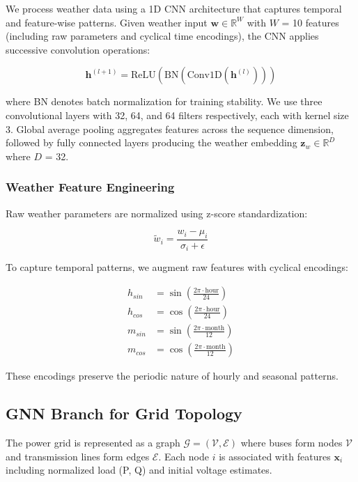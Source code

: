 \documentclass[journal,12pt,onecolumn]{IEEEtran}
\begin{document}
We process weather data using a 1D CNN architecture that captures temporal and feature-wise patterns. Given weather input $\mathbf{w} \in \mathbb{R}^{W}$ with $W$ = 10 features (including raw parameters and cyclical time encodings), the CNN applies successive convolution operations:

\begin{equation}
\mathbf{h}^{(l+1)} = \text{ReLU}(\text{BN}(\text{Conv1D}(\mathbf{h}^{(l)})))
\label{eq:cnn_layer}
\end{equation}

where BN denotes batch normalization for training stability. We use three convolutional layers with 32, 64, and 64 filters respectively, each with kernel size 3. Global average pooling aggregates features across the sequence dimension, followed by fully connected layers producing the weather embedding $\mathbf{z}_w \in \mathbb{R}^{D}$ where $D$ = 32.

\subsubsection{Weather Feature Engineering}

Raw weather parameters are normalized using z-score standardization:

\begin{equation}
\tilde{w}_i = \frac{w_i - \mu_i}{\sigma_i + \epsilon}
\label{eq:normalization}
\end{equation}

To capture temporal patterns, we augment raw features with cyclical encodings:

\begin{align}
h_{sin} &= \sin\left(\frac{2\pi \cdot \text{hour}}{24}\right) \\
h_{cos} &= \cos\left(\frac{2\pi \cdot \text{hour}}{24}\right) \\
m_{sin} &= \sin\left(\frac{2\pi \cdot \text{month}}{12}\right) \\
m_{cos} &= \cos\left(\frac{2\pi \cdot \text{month}}{12}\right)
\end{align}

These encodings preserve the periodic nature of hourly and seasonal patterns.

\subsection{GNN Branch for Grid Topology}

The power grid is represented as a graph $\mathcal{G} = (\mathcal{V}, \mathcal{E})$ where buses form nodes $\mathcal{V}$ and transmission lines form edges $\mathcal{E}$. Each node $i$ is associated with features $\mathbf{x}_i$ including normalized load (P, Q) and initial voltage estimates.
\end{document}
